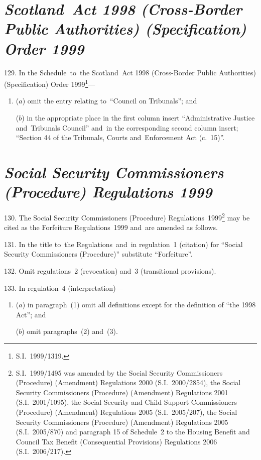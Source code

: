 \documentclass[12pt,a4paper]{article}
\begin{document}
\section*{\itshape Scotland~Act 1998 (Cross-Border Public Authorities) (Specification) Order 1999}

129.  In the Schedule~to~the Scotland~Act 1998 (Cross-Border Public Authorities) (Specification) Order 1999\footnote{S.I.~1999/1319.}—
\begin{enumerate}\item[]
($a$) omit the entry relating to~“Council on Tribunals”; and

($b$) in the appropriate place in the first column insert “Administrative Justice and~Tribunals Council” and~in the corresponding second column insert; “Section 44 of the Tribunals, Courts and~Enforcement Act (c.~15)”.
\end{enumerate}

\section*{\itshape\sloppy Social Security Commissioners (Procedure) Regulations 1999}

130.  The Social Security Commissioners (Procedure) Regulations~1999\footnote{S.I.~1999/1495 was amended by the Social Security Commissioners (Procedure) (Amendment) Regulations 2000 (S.I.~2000/2854), the Social Security Commissioners (Procedure) (Amendment) Regulations 2001 (S.I.~2001/1095), the Social Security and Child Support Commissioners (Procedure) (Amendment) Regulations 2005 (S.I.~2005/207), the Social Security Commissioners (Procedure) (Amendment) Regulations 2005 (S.I.~2005/870) and paragraph 15 of Schedule~2 to the Housing Benefit and Council Tax Benefit (Consequential Provisions) Regulations 2006 (S.I.~2006/217).} may be cited as the Forfeiture Regulations~1999 and~are amended as follows.

\medskip

131.  In the title to~the Regulations~and~in regulation~1 (citation) for “Social Security Commissioners (Procedure)” substitute “Forfeiture”.

\medskip

132.  Omit regulations~2 (revocation) and~3 (transitional provisions).

\medskip

133.  In regulation~4 (interpretation)—
\begin{enumerate}\item[]
($a$) in paragraph~(1) omit all definitions except for the definition of “the 1998 Act”; and

($b$) omit paragraphs~(2) and~(3).
\end{enumerate}
\end{document}
